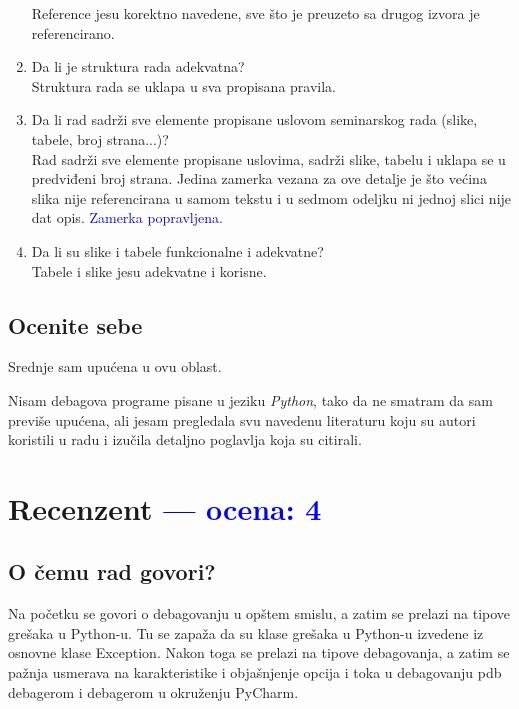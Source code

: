 \documentclass[a4paper]{report}
\newcommand{\odgovor}[1]{\textcolor{blue}{#1}}
\begin{document}
\begin{enumerate}
Reference jesu korektno navedene, sve što je preuzeto sa drugog izvora je referencirano.
\item Da li je struktura rada adekvatna?\\
Struktura rada se uklapa u sva propisana pravila. 
\item Da li rad sadrži sve elemente propisane uslovom seminarskog rada (slike, tabele, broj strana...)?\\
Rad sadrži sve elemente propisane uslovima, sadrži slike, tabelu i uklapa se u predviđeni broj strana. Jedina zamerka vezana za ove detalje je što većina slika nije referencirana u samom tekstu i u sedmom odeljku ni jednoj slici nije dat opis.
\odgovor{Zamerka popravljena.}
\item Da li su slike i tabele funkcionalne i adekvatne?\\
Tabele i slike jesu adekvatne i korisne.
\end{enumerate}

\section{Ocenite sebe}
Srednje sam upućena u ovu oblast.

Nisam debagova programe pisane u jeziku \emph{Python}, tako da ne smatram da sam previše upućena, ali jesam pregledala svu navedenu literaturu koju su autori koristili u radu i izučila detaljno poglavlja koja su citirali.
\chapter{Recenzent \odgovor{--- ocena: 4} }


\section{O čemu rad govori?}
Na početku se govori o debagovanju u opštem smislu, a zatim se prelazi na tipove grešaka u Python-u. Tu se zapaža da su klase grešaka u Python-u izvedene iz osnovne klase Exception. Nakon toga se prelazi na tipove debagovanja, a zatim se pažnja usmerava na karakteristike i objašnjenje opcija i toka u debagovanju pdb debagerom i debagerom u okruženju PyCharm.
\end{document}

